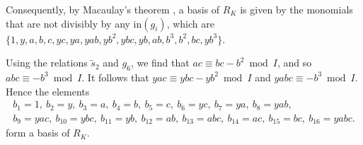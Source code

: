 \documentclass[a4paper, notitlepage, 10pt]{amsart}
\theoremstyle{plain} %
\theoremstyle{definition} %
\theoremstyle{remark} %
\numberwithin{equation}{section}
\begin{document}
Consequently, by Macaulay's theorem \cite[Theorem 15.3]{Eisen}, a basis of $R_K$ is given by the monomials that are not divisibly by any $\mathrm{in}(g_i)$, which are
$\{1,y,a,b,c,yc,ya,yab,yb^2,ybc,yb,ab,b^3,b^2,bc,yb^3\}.$

Using the relations $\widetilde{s}_2$ and $g_6$, we find that $ac\equiv bc-b^2\bmod I$, and so $abc\equiv -b^3 \bmod I$. It follows that $yac\equiv ybc-yb^2\bmod I$ and $yabc\equiv-b^3 \bmod I$. Hence the elements
    \begin{gather*}
               b_{1}= 1,\ b_{2}= y,\ b_{3} = a, \ b_{4}=b,\ b_{5}= c,\ b_{6}= yc,  \ b_7 = ya,\ b_8 = yab,
       \\ b_9= yac,\ b_{10}= ybc,\ b_{11}= yb,\ b_{12}= ab,\ b_{13}= abc,\ b_{14}= ac,\ b_{15}=  bc, \ b_{16}= yabc.
    \end{gather*}
form a basis of $R_K$. 
\end{document}
